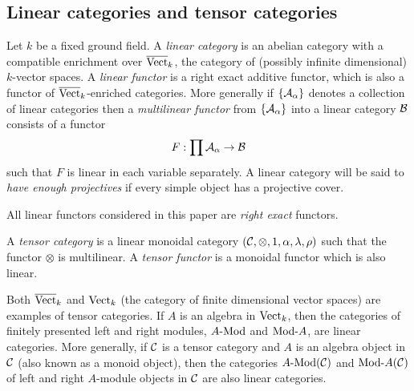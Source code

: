\documentclass{amsart}
\begin{document}




\subsection{Linear categories and tensor categories} \label{sec-tc-lincat}

	Let $k$ be a fixed ground field. A {\em linear category} is an abelian category with a compatible enrichment over $\overline{\mathrm{Vect}}_k$, the category of (possibly infinite dimensional) $k$-vector spaces. 
	 
A {\em linear functor} is a right exact additive functor, which is also a functor of $\overline{\mathrm{Vect}}_k$-enriched categories. 
	 
More generally if $\{\mathcal A_\alpha\}$ denotes a collection of linear categories then a {\em multilinear functor} from $\{\mathcal A_\alpha\}$ into a linear category $\mathcal B$ consists of a functor
\begin{equation*}
	F: \prod \mathcal A_\alpha \to \mathcal B
\end{equation*}
such that $F$ is linear in each variable separately. A linear category will be said to {\em have enough projectives} if every simple object has a projective cover. 

\begin{warning}
	All linear functors considered in this paper are {\em right exact} functors.
\end{warning}



\begin{definition}
	A {\em tensor category} is a linear monoidal category $(\mathcal C, \otimes, 1, \alpha, \lambda, \rho)$ such that the functor $\otimes$ is multilinear. A {\em tensor functor} is a monoidal functor which is also linear.
\end{definition}

\begin{example}
	Both $\overline{\mathrm{Vect}}_k$ and $\mathrm{Vect}_k$ (the category of finite dimensional vector spaces) are examples of tensor categories. If $A$ is an algebra in $\mathrm{Vect}_k$, then the categories of finitely presented left and right modules, $\Mod{A}{}$ and $\Mod{}{A}$, are linear categories. More generally, if $\mathcal C$ is a tensor category and $A$ is an algebra object in $\mathcal C$ (also known as a monoid object), then the categories $\Mod{A}{}(\cC)$ and $\Mod{}{A}(\cC)$ of left and right $A$-module objects in $\mathcal C$ are also linear categories.
\end{example}
\end{document}
